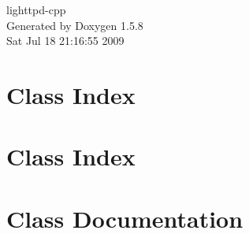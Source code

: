 \documentclass[a4paper]{book}
\begin{document}
\begin{titlepage}
\vspace*{7cm}
\begin{center}
{\Large lighttpd-cpp }\\
\vspace*{1cm}
{\large Generated by Doxygen 1.5.8}\\
\vspace*{0.5cm}
{\small Sat Jul 18 21:16:55 2009}\\
\end{center}
\end{titlepage}
\clearemptydoublepage
{}
\tableofcontents
\clearemptydoublepage
{}
\chapter{Class Index}

\chapter{Class Index}

\chapter{Class Documentation}





















\printindex
\end{document}
